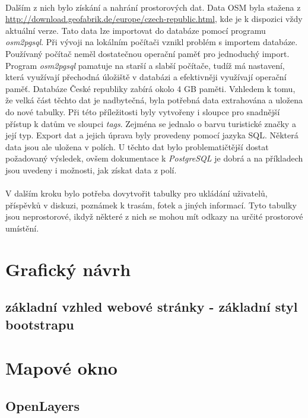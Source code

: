 \documentclass[11pt,a4paper,titlepage,oneside]{book}
\begin{document}
				\paragraph{}Dalším z nich bylo získání a nahrání prostorových dat. Data OSM byla stažena z  \url{http://download.geofabrik.de/europe/czech-republic.html}, kde je k dispozici vždy aktuální verze. Tato data lze importovat do databáze pomocí programu \textit{osm2pgsql}. Při vývoji na lokálním počítači vznikl problém s importem databáze. Používaný počítač neměl dostatečnou operační paměť pro jednoduchý import. Program \textit{osm2pgsql} pamatuje na starší a slabší počítače, tudíž má nastavení, která využívají přechodná úložiště v databázi a efektivněji využívají operační paměť. Databáze České republiky zabírá okolo 4 GB paměti. Vzhledem k tomu, že velká část těchto dat je nadbytečná, byla potřebná data extrahována a uložena do nové tabulky. Při této příležitosti byly vytvořeny i sloupce pro snadnější přístup k datům ve sloupci \textit{tags}. Zejména se jednalo o barvu turistické značky a její typ. Export dat a jejich úprava byly provedeny pomocí jazyka SQL. Některá data jsou ale uložena v polích. U těchto dat bylo problematičtější dostat požadovaný výsledek, ovšem dokumentace k \textit{PostgreSQL}\cite{PostgreSQL} je dobrá a na příkladech jsou uvedeny i možnosti, jak získat data z polí.
				\paragraph{} V dalším kroku bylo potřeba dovytvořit tabulky pro ukládání uživatelů, příspěvků v  diskuzi, poznámek k trasám, fotek a jiných informací. Tyto tabulky jsou neprostorové, ikdyž některé z nich se mohou mít odkazy na určité prostorové umístění.

		\section{Grafický návrh}
			\subsection{základní vzhled webové stránky - základní styl bootstrapu}
		\section{Mapové okno}
			\subsection{OpenLayers}
\end{document}
